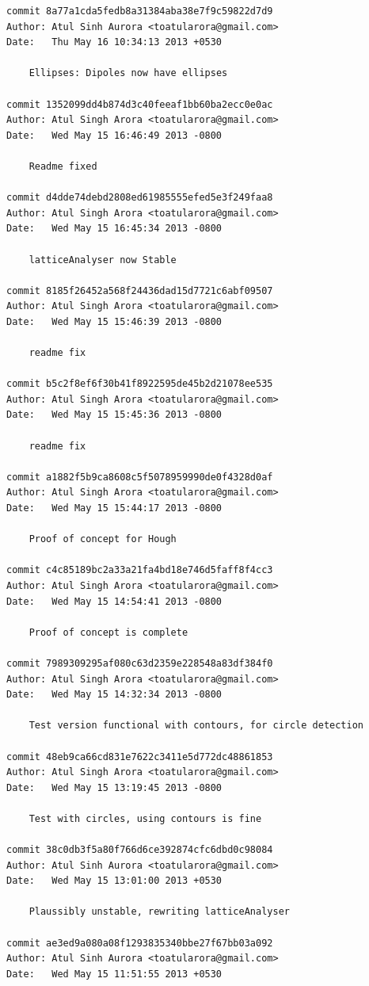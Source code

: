 \begin{lstlisting}
commit 8a77a1cda5fedb8a31384aba38e7f9c59822d7d9
Author: Atul Sinh Aurora <toatularora@gmail.com>
Date:   Thu May 16 10:34:13 2013 +0530

    Ellipses: Dipoles now have ellipses

commit 1352099dd4b874d3c40feeaf1bb60ba2ecc0e0ac
Author: Atul Singh Arora <toatularora@gmail.com>
Date:   Wed May 15 16:46:49 2013 -0800

    Readme fixed

commit d4dde74debd2808ed61985555efed5e3f249faa8
Author: Atul Singh Arora <toatularora@gmail.com>
Date:   Wed May 15 16:45:34 2013 -0800

    latticeAnalyser now Stable

commit 8185f26452a568f24436dad15d7721c6abf09507
Author: Atul Singh Arora <toatularora@gmail.com>
Date:   Wed May 15 15:46:39 2013 -0800

    readme fix

commit b5c2f8ef6f30b41f8922595de45b2d21078ee535
Author: Atul Singh Arora <toatularora@gmail.com>
Date:   Wed May 15 15:45:36 2013 -0800

    readme fix

commit a1882f5b9ca8608c5f5078959990de0f4328d0af
Author: Atul Singh Arora <toatularora@gmail.com>
Date:   Wed May 15 15:44:17 2013 -0800

    Proof of concept for Hough

commit c4c85189bc2a33a21fa4bd18e746d5faff8f4cc3
Author: Atul Singh Arora <toatularora@gmail.com>
Date:   Wed May 15 14:54:41 2013 -0800

    Proof of concept is complete

commit 7989309295af080c63d2359e228548a83df384f0
Author: Atul Singh Arora <toatularora@gmail.com>
Date:   Wed May 15 14:32:34 2013 -0800

    Test version functional with contours, for circle detection

commit 48eb9ca66cd831e7622c3411e5d772dc48861853
Author: Atul Singh Arora <toatularora@gmail.com>
Date:   Wed May 15 13:19:45 2013 -0800

    Test with circles, using contours is fine

commit 38c0db3f5a80f766d6ce392874cfc6dbd0c98084
Author: Atul Sinh Aurora <toatularora@gmail.com>
Date:   Wed May 15 13:01:00 2013 +0530

    Plaussibly unstable, rewriting latticeAnalyser

commit ae3ed9a080a08f1293835340bbe27f67bb03a092
Author: Atul Sinh Aurora <toatularora@gmail.com>
Date:   Wed May 15 11:51:55 2013 +0530


\end{lstlisting}
